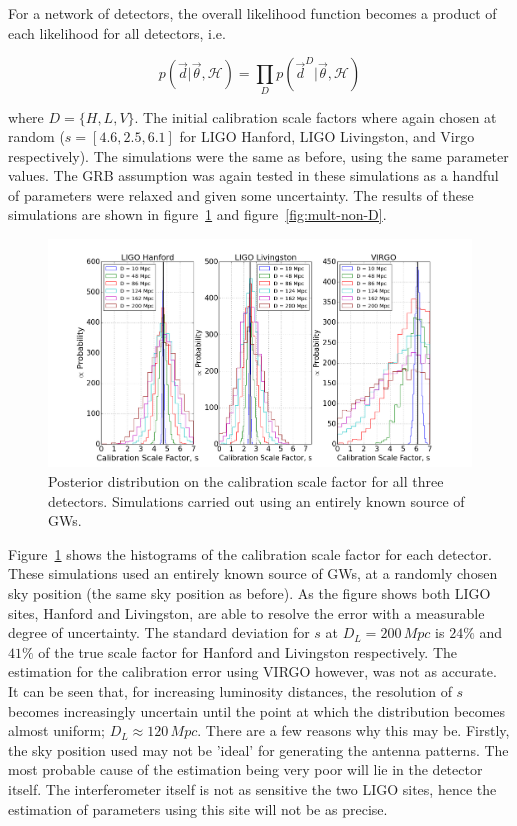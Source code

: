 \documentclass[12pt]{iopart}
\newcommand{\curlH}{\mathcal{H}}
\begin{document}
For a network of detectors, the overall likelihood function becomes a product
of each likelihood for all detectors, i.e.

\begin{equation}
  \label{eq:mult-likeli}
  p(\vec{d}| \vec{\theta}, \curlH) = \prod \limits_D p(\vec{d}^D| \vec{\theta},
\curlH)
\end{equation}

where $D = \{H,L,V\}$. The initial calibration scale factors where again chosen
at random ($s = [4.6, 2.5, 6.1]$ for LIGO Hanford, LIGO Livingston, and Virgo
respectively). The simulations were the same as before, using the same
parameter values. The GRB assumption was again tested in these simulations as a
handful of parameters were relaxed and given some uncertainty. The results of
these simulations are shown in figure~\ref{fig:mult-empty-D} and
figure~\ref{fig:mult-non-D}.

\begin{figure}
  \centering
  \includegraphics[width = \textwidth]{MD_empty_D10_200}
  \caption{Posterior distribution on the calibration scale factor for
all three detectors. Simulations carried out using an entirely known source of
GWs.}
    \label{fig:mult-empty-D}
\end{figure}

Figure~\ref{fig:mult-empty-D} shows the histograms of the calibration scale
factor for each detector. These simulations used an entirely known source of
GWs, at a randomly chosen sky position (the same sky position as before). As
the figure shows both LIGO sites, Hanford and Livingston, are able to resolve
the error with a measurable degree of uncertainty. The standard deviation for
$s$ at $D_{L}=200\,Mpc$ is $24\%$ and $41\%$ of the true scale factor for
Hanford and Livingston respectively. The estimation for the calibration error
using VIRGO however, was not as accurate. It can be seen that, for increasing
luminosity distances, the resolution of $s$ becomes increasingly uncertain
until the point at which the distribution becomes almost uniform; $D_{L}
\approx 120\,Mpc$. There are a few reasons why this may be. Firstly, the sky
position used may not be 'ideal' for generating the antenna patterns. The most
probable cause of the estimation being very poor will lie in the detector
itself. The interferometer itself is not as sensitive the two LIGO sites, hence
the estimation of parameters using this site will not be as precise.
\end{document}
